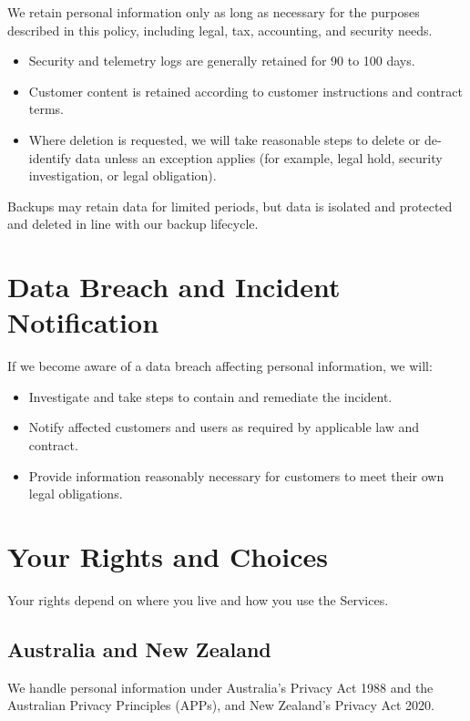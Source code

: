 \documentclass[11pt]{article}
\begin{document}
We retain personal information only as long as necessary for the purposes described in this policy, including legal, tax, accounting, and security needs.

\begin{itemize}
\item Security and telemetry logs are generally retained for 90 to 100 days.
\item Customer content is retained according to customer instructions and contract terms.
\item Where deletion is requested, we will take reasonable steps to delete or de-identify data unless an exception applies (for example, legal hold, security investigation, or legal obligation).
\end{itemize}

Backups may retain data for limited periods, but data is isolated and protected and deleted in line with our backup lifecycle.

\section{Data Breach and Incident Notification}

If we become aware of a data breach affecting personal information, we will:

\begin{itemize}
\item Investigate and take steps to contain and remediate the incident.
\item Notify affected customers and users as required by applicable law and contract.
\item Provide information reasonably necessary for customers to meet their own legal obligations.
\end{itemize}

\section{Your Rights and Choices}

Your rights depend on where you live and how you use the Services.

\subsection{Australia and New Zealand}

We handle personal information under Australia's Privacy Act 1988 and the Australian Privacy Principles (APPs), and New Zealand's Privacy Act 2020.
\end{document}
